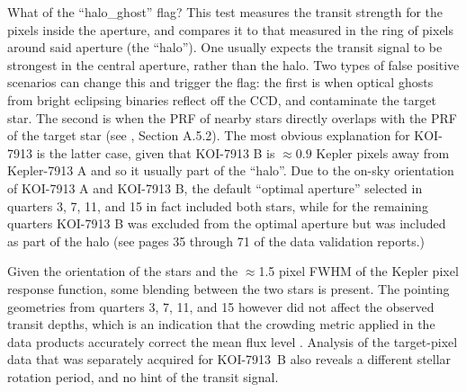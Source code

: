 \documentclass[12pt,twocolumn]{aastex63}
\begin{document}
What of the ``halo\_ghost'' flag?  This test measures the transit
strength for the pixels inside the aperture, and compares it to that
measured in the ring of pixels around said aperture (the ``halo'').
One usually expects the transit signal to be strongest in the
central aperture, rather than the halo.  Two types of false positive
scenarios can change this and trigger the flag: the first is when
optical ghosts from bright eclipsing binaries reflect off the CCD, and
contaminate the target star.  The second is when the PRF of nearby
stars directly overlaps with the PRF of the target star (see
\citealt{thompson_planetary_2018}, Section A.5.2).  The most obvious
explanation for KOI-7913 is the latter case, given that KOI-7913 B is
$\approx0.9$ Kepler pixels away from Kepler-7913 A and so it usually
part of the ``halo''.  Due to the on-sky orientation of KOI-7913 A and
KOI-7913 B, the default ``optimal aperture'' selected in quarters 3,
7, 11, and 15 in fact included both stars, while for the remaining
quarters KOI-7913 B was excluded from the optimal aperture but was
included as part of the halo (see pages 35 through 71 of the data
validation reports.)  

Given the orientation of the stars and the $\approx$1.5 pixel FWHM of
the Kepler pixel response function, some blending between the two
stars is present.  The pointing geometries from quarters 3, 7, 11, and
15 however did not affect the observed transit depths,
which is an indication that the crowding metric applied in the data
products accurately correct the mean flux level
\citep{2017ksci.rept....6M}.  Analysis of the target-pixel data that
was separately acquired for KOI-7913~B also reveals a
different stellar rotation period, and no hint of the transit signal.

\clearpage

\vspace{-6cm}



\end{document}
